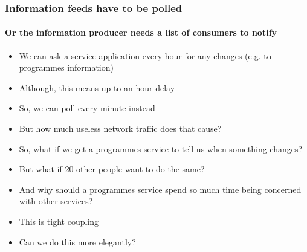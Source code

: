 \documentclass{beamer}
\begin{document}
\begin{frame}
  \frametitle{Information feeds have to be polled}
  \framesubtitle{Or the information producer needs a list of consumers to notify}
  \begin{itemize}
    \pause \item We can ask a service application every hour for any changes (e.g. to programmes information)
    \pause \item Although, this means up to an hour delay
    \pause \item So, we can poll every minute instead
    \pause \item But how much useless network traffic does that cause?
    \pause \item So, what if we get a programmes service to tell us when something changes?
    \pause \item But what if 20 other people want to do the same?
    \pause \item And why should a programmes service spend so much time being concerned with other services?
    \pause \item This is tight coupling
    \pause \item Can we do this more elegantly?
  \end{itemize}
\end{frame}
\end{document}
